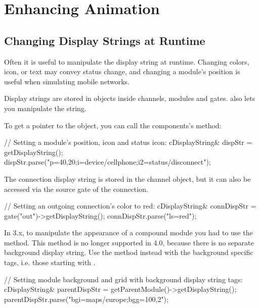 \section{Enhancing Animation}

\subsection{Changing Display Strings at Runtime}

Often it is useful to manipulate the display string at runtime.
Changing colors, icon, or text may convey status change, and
changing a module's position is useful when simulating mobile
networks.

Display strings are stored in  objects inside
channels, modules and gates.  also lets you
manipulate the string.

To get a pointer to the  object, you can call
the components's  method:

\begin{cpp}
// Setting a module's position, icon and status icon:
cDisplayString& dispStr = getDisplayString();
dispStr.parse("p=40,20;i=device/cellphone;i2=status/disconnect");
\end{cpp}

\begin{note}
The connection display string is stored in the channel object, but it
can also be accessed via the source gate of the connection.
\end{note}

\begin{cpp}
// Setting an outgoing connection's color to red:
cDisplayString& connDispStr = gate("out")->getDisplayString();
connDispStr.parse("ls=red");
\end{cpp}

\begin{note}
In {\opp} 3.x, to manipulate the appearance of a compound module you had to use
the  method. This method is no longer
supported in {\opp} 4.0, because there is no separate background display string.
Use the  method instead with the background
specific tags, i.e. those starting with .
\end{note}

\begin{cpp}
// Setting module background and grid with background display string tags:
cDisplayString& parentDispStr = getParentModule()->getDisplayString();
parentDispStr.parse("bgi=maps/europe;bgg=100,2");
\end{cpp}

